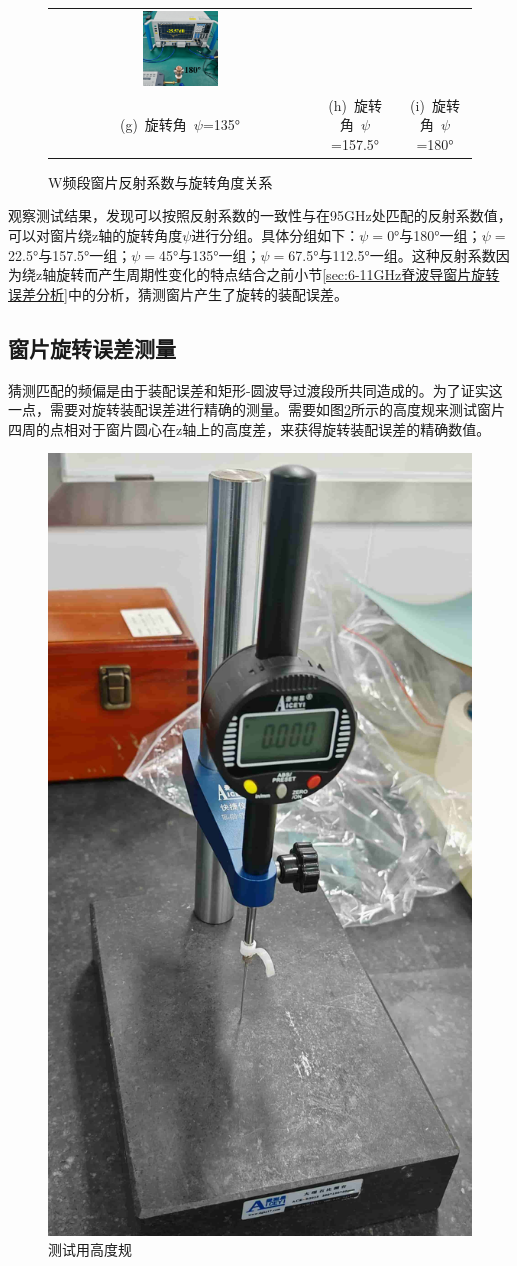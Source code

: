 \documentclass[master]{thesis-uestc}
\begin{document}
\begin{figure}[!htb]
\begin{tabular}{@{\ }c@{\ }c@{\ }c}
        \hspace{5pt}
        \includegraphics[width=0.3\textwidth]{pic/chapter5/测试旋转照片/180度.png}     \\
        \mbox{\small (g) 旋转角 \(\psi\)=135°}                                                                               & 
        \mbox{\small (h) 旋转角 \(\psi\)=157.5°}  & 
        \mbox{\small (i) 旋转角 \(\psi\)=180°}                       
    \end{tabular}
    \caption{W频段窗片反射系数与旋转角度关系}
    \label{fig:W频段反射系数与旋转角度关系}
\end{figure}

观察测试结果，发现可以按照反射系数的一致性与在95GHz处匹配的反射系数值，可以对窗片绕z轴的旋转角度\(\psi\)进行分组。具体分组如下：\(\psi=\)0°与180°一组；\(\psi=\)22.5°与157.5°一组；\(\psi=\)45°与135°一组；\(\psi=\)67.5°与112.5°一组。这种反射系数因为绕z轴旋转而产生周期性变化的特点结合之前小节\ref{sec:6-11GHz脊波导窗片旋转误差分析}中的分析，猜测窗片产生了旋转的装配误差。

\subsection{窗片旋转误差测量}
猜测匹配的频偏是由于装配误差和矩形-圆波导过渡段所共同造成的。为了证实这一点，需要对旋转装配误差进行精确的测量。需要如图\ref{fig:高度规}所示的高度规来测试窗片四周的点相对于窗片圆心在z轴上的高度差，来获得旋转装配误差的精确数值。
\begin{figure}[!htb]
    \centering
    \includegraphics[width=0.2\linewidth]{pic/chapter5/高度规.jpg}
    \caption{测试用高度规}
    \label{fig:高度规}
\end{figure}
\end{document}
